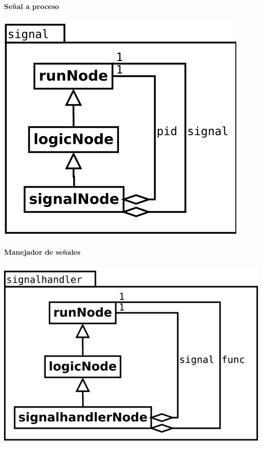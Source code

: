 \begin{multicols}{2}
   \paragraph {Señal a proceso} 
   \begin{center}
   \includegraphics[scale=0.4]{signal.png} \\
   \end{center}
\columnbreak
   \paragraph {Manejador de señales} 
   \begin{center}
   \includegraphics[scale=0.4]{signalhandler.png} \\
   \end{center}
\end{multicols}


